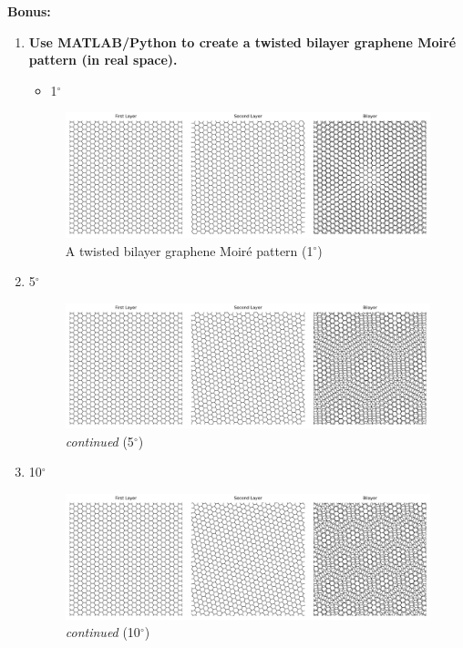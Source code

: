 \documentclass[12pt,a4paper]{article}
\begin{document}
\begin{CJK}{UTF8}{bkai}
\textbf{Bonus:}
\begin{enumerate}
    \item \textbf{Use MATLAB/Python to create a twisted bilayer graphene Moiré pattern (in real space).}
    \begin{itemize}
        \item 1$^\circ$
    \end{itemize}
    \begin{figure}[h]
        \centering
        \includegraphics[width=0.82\linewidth]{figures/1degree.png}
        \caption{A twisted bilayer graphene Moiré pattern (1$^\circ$)}
        \label{fig:moire_1}
    \end{figure}
    \clearpage
    \item 5$^\circ$
    \begin{figure}[h]
        \centering
        \includegraphics[width=0.82\linewidth]{figures/5degree.png}
        \caption{\textit{continued} (5$^\circ$)}
        \label{fig:moire_5}
    \end{figure}
    \item 10$^\circ$
    \begin{figure}[h]
        \centering
        \includegraphics[width=0.82\linewidth]{figures/10degree.png}
        \caption{\textit{continued} (10$^\circ$)}
        \label{fig:moire_10}
    \end{figure}
    

\end{enumerate}
\end{CJK}
\end{document}
